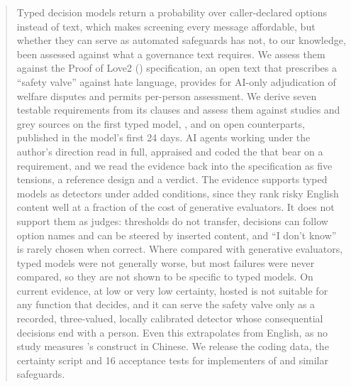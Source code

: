 \begin{abstract}
Typed decision models return a probability over caller-declared options instead of text, which makes screening every message affordable, but whether they can serve as automated safeguards has not, to our knowledge, been assessed against what a governance text requires.
We assess them against the Proof of Love2 (\pol{}) specification, an open text that prescribes a ``safety valve'' against hate language, provides for AI-only adjudication of welfare disputes and permits per-person assessment.
We derive seven testable requirements from its clauses and assess them against \nStudies{} studies and \nGreyAll{} grey sources on the first typed model, \jev{}, and on open counterparts, published in the model's first 24 days.
AI agents working under the author's direction read in full, appraised and coded the \nCodedAll{} that bear on a requirement, and we read the evidence back into the specification as five tensions, a reference design and a verdict.
The evidence supports typed models as detectors under added conditions, since they rank risky English content well at a fraction of the cost of generative evaluators.
It does not support them as judges: thresholds do not transfer, decisions can follow option names and can be steered by inserted content, and ``I don't know'' is rarely chosen when correct.
Where compared with generative evaluators, typed models were not generally worse, but most failures were never compared, so they are not shown to be specific to typed models.
On current evidence, at low or very low certainty, hosted \jev{} is not suitable for any \pol{} function that decides, and it can serve the safety valve only as a recorded, three-valued, locally calibrated detector whose consequential decisions end with a person.
Even this extrapolates from English, as no study measures \pol{}'s construct in Chinese.
We release the coding data, the certainty script and 16 acceptance tests for implementers of \pol{} and similar safeguards.
\end{abstract}
